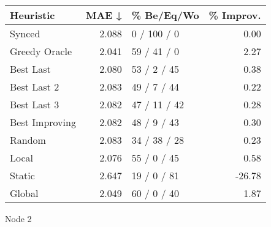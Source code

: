 \begin{tabular}{lrlr}
\toprule
\textbf{Heuristic} & \textbf{MAE ↓} & \textbf{\% Be/Eq/Wo} & \textbf{\% Improv.} \\
\midrule
            Synced &          2.088 &          0 / 100 / 0 &                0.00 \\
     Greedy Oracle &          2.041 &          59 / 41 / 0 &                2.27 \\
         Best Last &          2.080 &          53 / 2 / 45 &                0.38 \\
       Best Last 2 &          2.083 &          49 / 7 / 44 &                0.22 \\
       Best Last 3 &          2.082 &         47 / 11 / 42 &                0.28 \\
    Best Improving &          2.082 &          48 / 9 / 43 &                0.30 \\
            Random &          2.083 &         34 / 38 / 28 &                0.23 \\
             Local &          2.076 &          55 / 0 / 45 &                0.58 \\
            Static &          2.647 &          19 / 0 / 81 &              -26.78 \\
            Global &          2.049 &          60 / 0 / 40 &                1.87 \\
\bottomrule
\end{tabular}
\caption{Node 2}
\label{tab:hr_non_lr01_le1_bs2_2}
